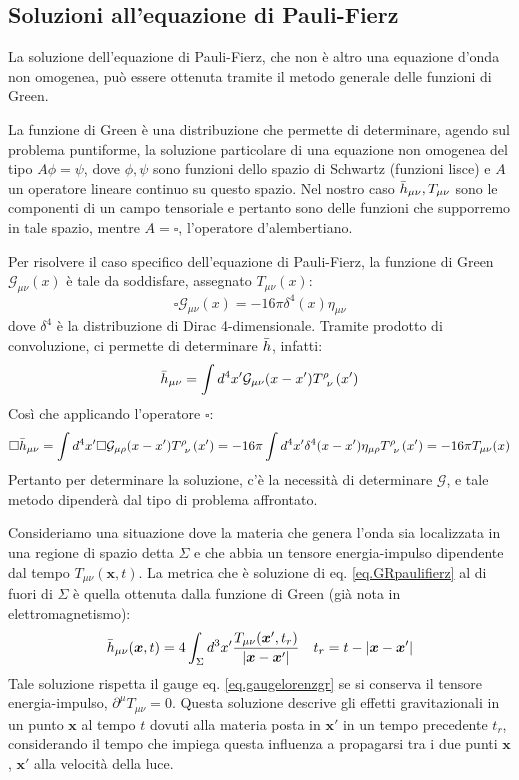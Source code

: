 \subsection{Soluzioni all'equazione di Pauli-Fierz}
La soluzione dell'equazione di Pauli-Fierz, che non è altro una equazione d'onda non omogenea, può essere ottenuta tramite il metodo generale delle funzioni di Green.

La funzione di Green è una distribuzione che permette di determinare, agendo sul problema puntiforme, la soluzione particolare di una equazione non omogenea del tipo $A\phi = \psi$, dove $\phi, \psi$ sono funzioni dello spazio di Schwartz (funzioni lisce) e $A$ un operatore lineare continuo su questo spazio. Nel nostro caso $\Bar{h}_{\mu\nu}, T_{\mu\nu}$ sono le componenti di un campo tensoriale e pertanto sono delle funzioni che supporremo in tale spazio, mentre $A=\square$, l'operatore d'alembertiano.

Per risolvere il caso specifico dell'equazione di Pauli-Fierz, la funzione di Green $\mathcal{G}_{\mu\nu}(x)$ è tale da soddisfare, assegnato $T_{\mu\nu}(x)$:
\begin{equation*}
    \square \mathcal{G}_{\mu\nu}(x) = -16\pi\delta^4(x) \eta_{\mu\nu}
\end{equation*}
dove $\delta^4$ è la distribuzione di Dirac 4-dimensionale.
Tramite prodotto di convoluzione, ci permette di determinare $\Bar{h}$, infatti:
\begin{equation*}
    \Bar{h}_{\mu\nu} = \int d^4x' \mathcal{G}_{\mu\nu}(x-x') \tensor{T}{^\rho_\nu}(x')
\end{equation*}
Così che applicando l'operatore $\square$:
\begin{equation*}
    \square \Bar{h}_{\mu\nu} = \int d^4x' \square\mathcal{G}_{\mu\rho}(x-x') \tensor{T}{^\rho_\nu}(x') = -16\pi \int d^4x'\delta^4(x-x')\eta_{\mu\rho}\tensor{T}{^\rho_\nu}(x') = -16\pi T_{\mu\nu}(x)
\end{equation*}
Pertanto per determinare la soluzione, c'è la necessità di determinare $\mathcal{G}$, e tale metodo dipenderà dal tipo di problema affrontato.

Consideriamo una situazione dove la materia che genera l'onda sia localizzata in una regione di spazio detta $\Sigma$ e che abbia un tensore energia-impulso dipendente dal tempo $T_{\mu\nu}(\bm{x},t)$.
La metrica che è soluzione di eq. \ref{eq.GRpaulifierz} al di fuori di $\Sigma$ è quella ottenuta dalla funzione di Green (già nota in elettromagnetismo):
\begin{align}
     \Bar{h}_{\mu\nu}(\bm{x},t) = 4\int_\Sigma d^3x' \frac{T_{\mu\nu}(\bm{x}', t_r)}{| \bm{x} - \bm{x}'|} && t_r = t - | \bm{x} - \bm{x}'|
\end{align}
Tale soluzione rispetta il gauge eq. \ref{eq.gaugelorenzgr} se si conserva il tensore energia-impulso, $\partial^\mu T_{\mu\nu} = 0$. Questa soluzione descrive gli effetti gravitazionali in un punto $\bm{x}$ al tempo $t$ dovuti alla materia posta in $\bm{x}'$ in un tempo precedente $t_r$, considerando il tempo che impiega questa influenza a propagarsi tra i due punti $\bm{x}$, $\bm{x}'$ alla velocità della luce.
